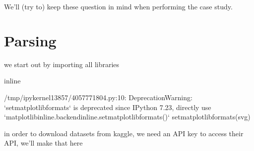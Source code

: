 \documentclass[letterpaper,10pt,english]{jupyterBook}
\begin{document}
\sphinxAtStartPar
We’ll (try to) keep these question in mind when performing the case study.


\section{Parsing}
\label{\detokenize{c7_case_studies/Churn:parsing}}
\sphinxAtStartPar
we start out by importing all libraries

\begin{sphinxVerbatim}[commandchars=\\\{\}]
 
 
   
   
   
 
   
   
 inline
\end{sphinxVerbatim}

\begin{sphinxVerbatim}[commandchars=\\\{\}]
/tmp/ipykernel\PYGZus{}13857/4057771804.py:10: DeprecationWarning: `set\PYGZus{}matplotlib\PYGZus{}formats` is deprecated since IPython 7.23, directly use `matplotlib\PYGZus{}inline.backend\PYGZus{}inline.set\PYGZus{}matplotlib\PYGZus{}formats()`
  set\PYGZus{}matplotlib\PYGZus{}formats(\PYGZsq{}svg\PYGZsq{})
\end{sphinxVerbatim}

\sphinxAtStartPar
in order to download datasets from kaggle, we need an API key to access their API, we’ll make that here
\end{document}
